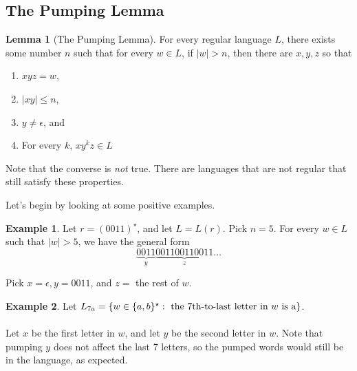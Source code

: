 \documentclass[]{article}
\DeclarePairedDelimiter{\set}{\lbrace}{\rbrace}
\theoremstyle{definition}
\newtheorem*{lemma}{Lemma}
\newtheorem{ex}{Example}[section]
\begin{document}
      \subsection{The Pumping Lemma}
       \begin{lemma}[The Pumping Lemma]
          For every regular language $L$, there exists some number $n$ such that for every $w \in L$, if $|w| > n$, then there are $x, y, z$ so that
          \begin{enumerate}
            \item $xyz = w$,
            \item $|xy| \le n$,
            \item $y \ne \epsilon$, and
            \item For every $k$, $xy^k z \in L$
          \end{enumerate}
        \end{lemma}

        Note that the converse is \emph{not} true. There are languages that are not regular that still satisfy these properties.

        Let's begin by looking at some positive examples.
        \begin{ex}
          Let $r = (0011)^\star$, and let $L = L(r)$. Pick $n = 5$. For every $w \in L$ such that $|w| > 5$, we have the general form
          $$
            \underbrace{0011}_{y} \underbrace{001100110011}_{z} \ldots
          $$

          Pick $x = \epsilon, y = 0011$, and $z = $ the rest of $w$.
        \end{ex}

        \begin{ex}
          Let $L_{7a} = \set{ w \in \set{a, b}^\star : \text{ the 7th-to-last letter in } w \text{ is a}}$.
          \\ \\
          Let $x$ be the first letter in $w$, and let $y$ be the second letter in $w$. Note that pumping $y$ does not affect the last 7 letters, so the pumped words would still be in the language, as expected.
        \end{ex}
\end{document}
